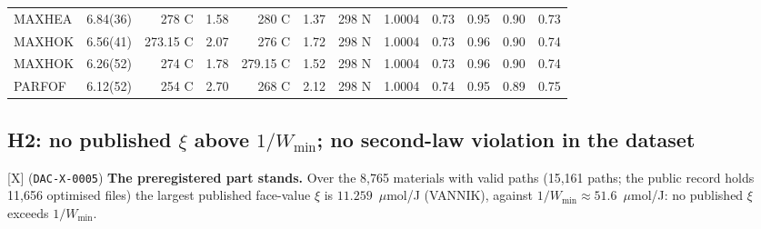 \documentclass[10pt]{article}
\newcommand{\tier}[1]{\textsf{[#1]}}
\newcommand{\tX}{\tier{X}}
\newcommand{\id}[1]{\texttt{DAC-#1}}
\newcommand{\umolJ}{\ensuremath{\mu}mol/J}
\begin{document}
\begin{table}[h]
\begin{tabular}{llrrrrrrrrrr}
MAXHEA & 6.84(36) & 278 C & 1.58 & 280 C & 1.37 & 298 N & 1.0004 & 0.73 & 0.95 & 0.90 & 0.73\\
MAXHOK & 6.56(41) & 273.15 C & 2.07 & 276 C & 1.72 & 298 N & 1.0004 & 0.73 & 0.96 & 0.90 & 0.74\\
MAXHOK & 6.26(52) & 274 C & 1.78 & 279.15 C & 1.52 & 298 N & 1.0004 & 0.73 & 0.96 & 0.90 & 0.74\\
PARFOF & 6.12(52) & 254 C & 2.70 & 268 C & 2.12 & 298 N & 1.0004 & 0.74 & 0.95 & 0.89 & 0.75\\
\bottomrule
\end{tabular}
\end{table}

\subsection{H2: no published \texorpdfstring{$\xi$}{xi} above \texorpdfstring{$1/W_{\min}$}{1/Wmin}; no second-law violation in the dataset}\label{sec:h2}
\tX{} (\id{X-0005}) \textbf{The preregistered part stands.} Over the 8,765 materials with valid paths (15,161 paths; the public record holds 11,656 optimised files) the largest published face-value $\xi$ is $11.259$~\umolJ{} (VANNIK), against $1/W_{\min}\approx51.6$~\umolJ{}: no published $\xi$ exceeds $1/W_{\min}$.
\end{document}
